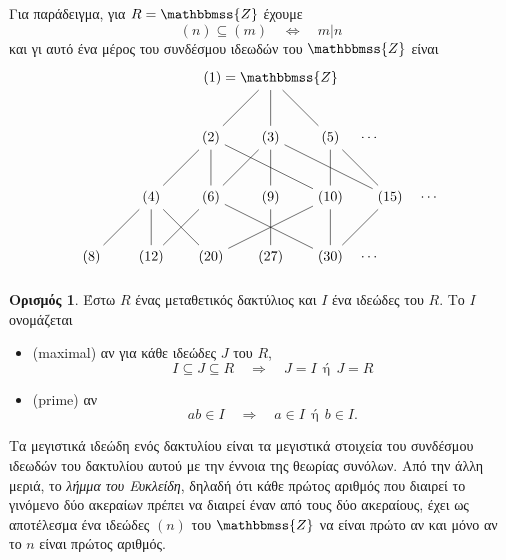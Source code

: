 \documentclass[12pt,a4paper,reqno]{amsart}
\theoremstyle{definition}
\newtheorem{definition}[theorem]{Ορισμός}
\theoremstyle{remark}
\numberwithin{theorem}{section}
\numberwithin{exercise}{section}
\numberwithin{equation}{section}
\newcommand{\ZZ}{\mathbbmss{Z}}
\newcommand{\then}{\Rightarrow}
\newcommand{\defn}[1]{{\color{mylightblue}{#1}}}
\begin{document}
Για παράδειγμα, για $R = \ZZ$ έχουμε 
\[
(n) \subseteq (m) \quad \Leftrightarrow \quad m\vert{n}
\]
και γι αυτό ένα μέρος του συνδέσμου ιδεωδών του $\ZZ$ είναι
\[
\begin{tikzpicture}
    \begin{scope}[shift={(0,0)}]
        \node (8) at (0,0) {$(8)$};
        \node (4) at (1.5,1.5) {$(4)$};
        \node (2) at (3,3) {$(2)$};
        \node (1) at (4.5,4.5) {$(1) = \ZZ$};

        \node (12) at (1.5,0) {$(12)$};
        \node (6) at (3,1.5) {$(6)$};
        \node (3) at (4.5,3) {$(3)$};

        \node (20) at (3,0) {$(20)$};
        \node (9) at (4.5,1.5) {$(9)$};

        \node (27) at (4.5,0) {$(27)$};

        \node (30) at (6,0) {$(30)$};
        \node (10) at (6,1.5) {$(10)$};
        \node (5) at (6,3) {$(5)$};

        \node (15) at (7.5,1.5) {$(15)$};

        \node (dots1) at (7,3) {$\cdots$};
        \node (dots2) at (8.5,1.5) {$\cdots$};
        \node (dots3) at (7,0) {$\cdots$};

        \draw (1)--(2)--(4)--(8);
        \draw (1)--(3) (1)--(5);
        \draw (2) -- (6) (2) --(10);
        \draw (3) -- (9) -- (27) (3) -- (15) (3) -- (6);
        \draw (5) -- (10) (5) -- (15);
        \draw (4) -- (12) (4) -- (20);
        \draw (6) -- (12) (6) -- (30);
        \draw (10) -- (20) (10) -- (30);
        \draw (15) -- (30);
    \end{scope}
\end{tikzpicture}
\]

\begin{definition}
    \label{def:maximal_prime_ideals}
    Έστω $R$ ένας μεταθετικός δακτύλιος και $I$ ένα ιδεώδες του $R$. Το $I$ ονομάζεται 
    \begin{itemize}
        \item \defn{μεγιστικό} (maximal) αν για κάθε ιδεώδες $J$ του $R$, 
        \[
        I \subseteq J \subseteq R \quad \then \quad J = I \ \ \text{ή} \ \ J = R
        \]
        \item \defn{πρώτο} (prime) αν 
        \[
        ab \in I \quad \then \quad a \in I \ \ \text{ή} \ \ b \in I.
        \]
    \end{itemize}
\end{definition}

Τα μεγιστικά ιδεώδη ενός δακτυλίου είναι τα μεγιστικά στοιχεία του συνδέσμου ιδεωδών του δακτυλίου αυτού με την έννοια της θεωρίας συνόλων. Από την άλλη μεριά, το \emph{λήμμα του Ευκλείδη}, δηλαδή ότι κάθε πρώτος αριθμός που διαιρεί το γινόμενο δύο ακεραίων πρέπει να διαιρεί έναν από τους δύο ακεραίους, έχει ως αποτέλεσμα ένα ιδεώδες $(n)$ του $\ZZ$ να είναι πρώτο αν και μόνο αν το $n$ είναι πρώτος αριθμός. 
\end{document}

